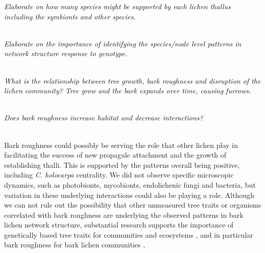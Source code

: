 \documentclass[11pt,twocolumn,twoside,lineno]{pnas-new}
\begin{document}
\textit{Elaborate on how many species might be supported by each
  lichen thallus including the symbionts and other species.}

\\

\textit{Elaborate on the importance of identifying the species/node
  level patterns in network structure response to genotype.}

\\

\textit{What is the relationship between tree growth, bark roughness
  and disruption of the lichen community? Tree grow and the bark
  expands over time, causing furrows. }

\\

\textit{Does bark roughness increase habitat and decrease interactions?}

\\

Bark roughness could possibly be serving the role that other lichen
play in facilitating the success of new propagule attachment and the
growth of establishing thalli. This is supported by the patterns
overall being positive, including \textit{C. holocarpa} centrality. We
did not observe specific microscopic dynamics, such as photobionts,
mycobionts, endolichenic fungi and bacteria, but variation in these
underlying interactions could also be playing a role. Although we can
not rule out the possibility that other unmeasured tree traits or
organisms correlated with bark roughness are underlying the observed
patterns in bark lichen network structure, substantial research
supports the importance of genetically based tree traits for
communities and ecosystems \cite{DesRoches2018TheVariation}, and in
particular bark roughness for bark lichen communities \cite{Bdeir2017,
  Lamit2011, Lamit2015a},
\end{document}
